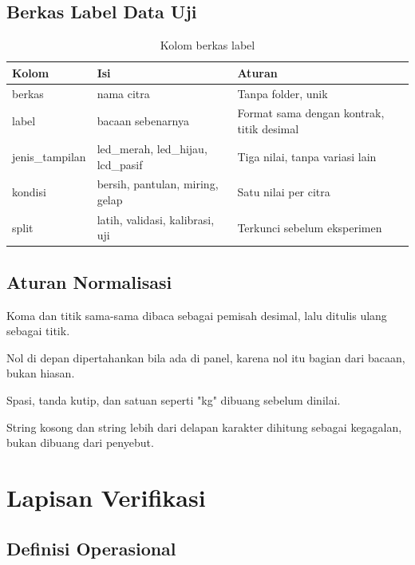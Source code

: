 \documentclass[12pt,a4paper,oneside]{report}
\begin{document}
\section{Berkas Label Data Uji}

\begin{table}[H]
\caption{Kolom berkas label}
\label{tab:label}
\begin{tabularx}{\textwidth}{@{}L{2.6cm} L{4.6cm} X@{}}
\toprule
\textbf{Kolom} & \textbf{Isi} & \textbf{Aturan} \\
\midrule
berkas & nama citra & Tanpa folder, unik \\
label & bacaan sebenarnya & Format sama dengan kontrak, titik desimal \\
jenis\_tampilan & led\_merah, led\_hijau, lcd\_pasif & Tiga nilai, tanpa variasi lain \\
kondisi & bersih, pantulan, miring, gelap & Satu nilai per citra \\
split & latih, validasi, kalibrasi, uji & Terkunci sebelum eksperimen \\
\bottomrule
\end{tabularx}
\end{table}

\section{Aturan Normalisasi}

\begin{poin}
  \item Koma dan titik sama-sama dibaca sebagai pemisah desimal, lalu ditulis
        ulang sebagai titik.
  \item Nol di depan dipertahankan bila ada di panel, karena nol itu bagian dari
        bacaan, bukan hiasan.
  \item Spasi, tanda kutip, dan satuan seperti "kg" dibuang sebelum dinilai.
  \item String kosong dan string lebih dari delapan karakter dihitung sebagai
        kegagalan, bukan dibuang dari penyebut.
\end{poin}

\chapter{Lapisan Verifikasi}

\section{Definisi Operasional}
\end{document}
